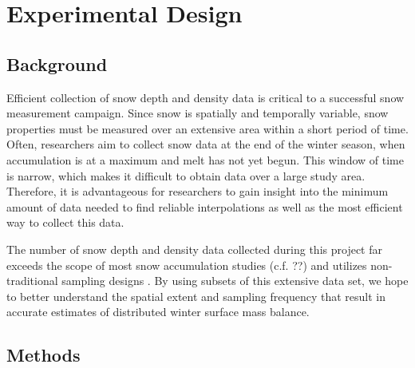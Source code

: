\documentclass[12pt]{article}
\begin{document}
\section{Experimental Design}
\label{sec:experimentaldesign}

\subsection{Background}

Efficient collection of snow depth and density data is critical to a successful snow measurement campaign. Since snow is spatially and temporally variable, snow properties must be measured over an extensive area within a short period of time. Often, researchers aim to collect snow data at the end of the winter season, when accumulation is at a maximum and melt has not yet begun. This window of time is narrow, which makes it difficult to obtain data over a large study area. Therefore, it is advantageous for researchers to gain insight into the minimum amount of data needed to find reliable interpolations as well as the most efficient way to collect this data. 

The number of snow depth and density data collected during this project far exceeds the scope of most snow accumulation studies (c.f. ??) and utilizes non-traditional sampling designs \citep[e.g. zigzag design from][]{Shea2010}. By using subsets of this extensive data set, we hope to better understand the spatial extent and sampling frequency that result in accurate estimates of distributed winter surface mass balance.  

\subsection{Methods}
\label{sec:experimentaldesign_methods}
\end{document}
